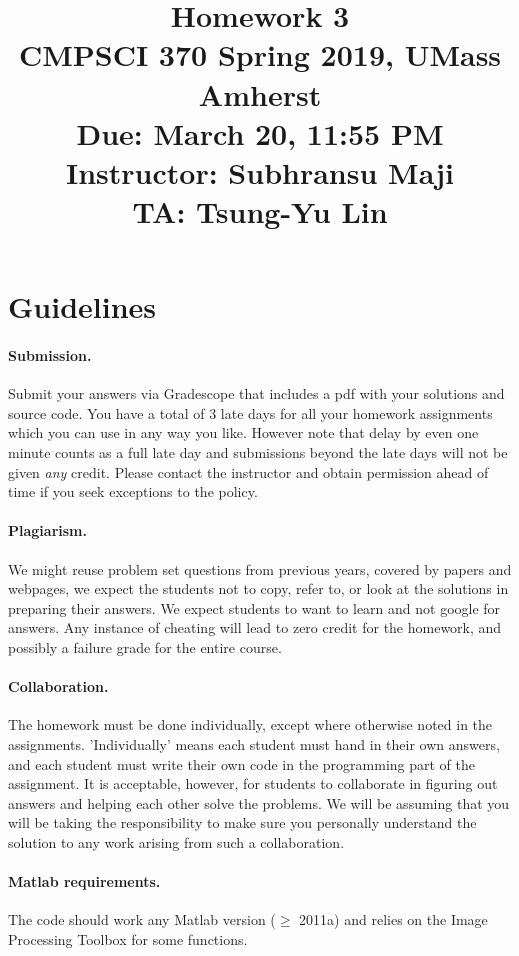 \documentclass[10pt,letterpaper]{article}
\title{
  Homework 3 \\
  \Large{CMPSCI 370 Spring 2019, UMass Amherst} \\
  \Large{Due: March 20, 11:55 PM} \\
  \Large{Instructor: Subhransu Maji} \\
  \Large{TA: Tsung-Yu Lin}
}
\date{}
\begin{document}
\maketitle

\renewcommand\thesubsection{\thesection.\alph{subsection}}


\section*{Guidelines}

\paragraph{Submission.} Submit your answers via Gradescope that includes a pdf with your solutions and source code. You have a total of 3 late days for all your homework assignments which you can use in any way you like. However note that delay by even one minute counts as a full late day and submissions beyond the late days will not be given \emph{any} credit. Please contact the instructor and obtain permission ahead of time if you seek exceptions to the policy.

\paragraph{Plagiarism.} We might reuse problem set questions from previous years, covered by papers and webpages, we expect the students not to copy, refer to, or look at the solutions in preparing their answers. We expect students to want to learn and not google for answers. Any instance of cheating will lead to zero credit for the homework, and possibly a failure grade for the entire course.

\paragraph{Collaboration.} The homework must be done individually, except where otherwise noted in the assignments. 'Individually' means each student must hand in their own answers, and each student must write their own code in the programming part of the assignment. It is acceptable, however, for students to collaborate in figuring out answers and helping each other solve the problems. We will be assuming that you will be taking the responsibility to make sure you personally understand the solution to any work arising from such a collaboration.

\paragraph{Matlab requirements.} The code should work any Matlab version ($\geq$ 2011a) and relies on the Image Processing Toolbox for some functions.
\end{document}
